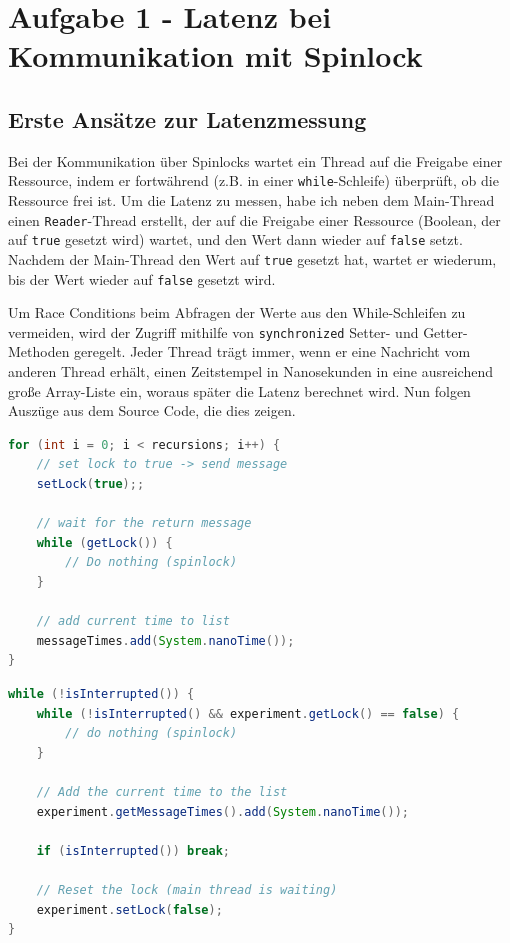 \documentclass[12pt]{article}
\begin{document}
\section{Aufgabe 1 - Latenz bei Kommunikation mit Spinlock}
\subsection*{Erste Ansätze zur Latenzmessung}
Bei der Kommunikation über Spinlocks wartet ein Thread auf die Freigabe einer Ressource, indem er fortwährend (z.B. in einer \texttt{while}-Schleife) überprüft, ob die Ressource frei ist. 
Um die Latenz zu messen, habe ich neben dem Main-Thread einen \texttt{Reader}-Thread erstellt, der auf die Freigabe einer Ressource (Boolean, der auf \texttt{true} gesetzt wird) wartet, und den Wert dann wieder auf \texttt{false} setzt. 
Nachdem der Main-Thread den Wert auf \texttt{true} gesetzt hat, wartet er wiederum, bis der Wert wieder auf \texttt{false} gesetzt wird.

Um Race Conditions beim Abfragen der Werte aus den While-Schleifen zu vermeiden, wird der Zugriff mithilfe von \texttt{synchronized} Setter- und Getter-Methoden geregelt.
Jeder Thread trägt immer, wenn er eine Nachricht vom anderen Thread erhält, einen Zeitstempel in Nanosekunden in eine ausreichend große Array-Liste ein, woraus später die Latenz berechnet wird.
Nun folgen Auszüge aus dem Source Code, die dies zeigen.

\begin{lstlisting}[language=java,caption={Latenzmessung im Main Thread}]
for (int i = 0; i < recursions; i++) {
	// set lock to true -> send message
	setLock(true);;
	
	// wait for the return message
	while (getLock()) {
		// Do nothing (spinlock)
	}
	
	// add current time to list
	messageTimes.add(System.nanoTime());
}
\end{lstlisting}

\begin{lstlisting}[language=java,caption={Latenzmessung im Reader Thread}]
while (!isInterrupted()) {
	while (!isInterrupted() && experiment.getLock() == false) {
		// do nothing (spinlock)
	}
	
	// Add the current time to the list
	experiment.getMessageTimes().add(System.nanoTime());
	
	if (isInterrupted()) break;
	
	// Reset the lock (main thread is waiting)
	experiment.setLock(false);
}
\end{lstlisting}
\end{document}

